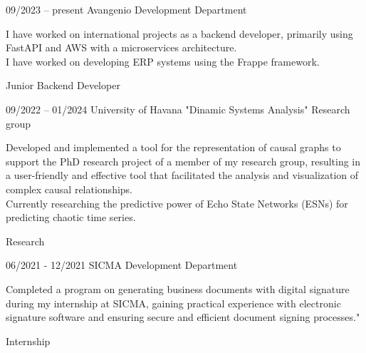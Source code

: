 \documentclass[9pt, blue]{./template/developercv} %
\begin{document}

\vspace{8pt}
\vspace{2.1mm}
\begin{entrylist}
	\entry
	{09/2023 -- present}
	{Avangenio}
	{Development Department}
	{
		\vspace{0.3mm}
		\begin{minipage}[t]{0.75\textwidth}
			\vspace{-\baselineskip}
			\itemmarker I have worked on international projects as a backend developer, primarily using FastAPI and AWS with a microservices architecture.\\
			\itemmarker I have worked on developing ERP systems using the Frappe framework.
		\end{minipage}

	}
	{Junior Backend Developer}


	\entry
	{09/2022 -- 01/2024}
	{University of Havana}
	{"Dinamic Systems Analysis" Research group}
	{
		\vspace{0.3mm}
		\begin{minipage}[t]{0.75\textwidth}
			\vspace{-\baselineskip}
			\itemmarker Developed and implemented a tool for the representation of causal graphs to support the PhD research project of a member of my research group, resulting in a user-friendly and effective tool that facilitated the analysis and visualization of complex causal relationships. \\
			\itemmarker Currently researching the predictive power of Echo State Networks (ESNs) for predicting chaotic time series. \\
		\end{minipage}

	}
	{Research}


	\entry
	{06/2021 - 12/2021}
	{SICMA}
	{Development Department}
	{
		\vspace{0.3mm}
		\begin{minipage}[t]{0.75\textwidth}
			\vspace{-\baselineskip}
			\itemmarker Completed a program on generating business documents with digital signature during my internship at SICMA, gaining practical experience with electronic signature software and ensuring secure and efficient document signing processes."\\
 			\vspace{-3mm}
		\end{minipage}

	}
	{Internship}

\end{entrylist}
\end{document}
